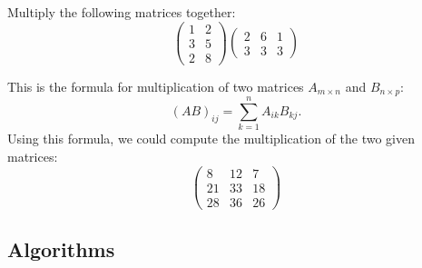 \documentclass{ximera}
\begin{document}
\begin{question}
Multiply the following matrices together:
\[ \left( \begin{array}{cc}
1 & 2 \\
3 & 5 \\
2 & 8
\end{array} \right)
%
\left( \begin{array}{ccc}
2 & 6 & 1 \\
3 & 3 & 3
\end{array} \right)
\]
\begin{solution}
\end{solution}
This is the formula for multiplication of two matrices $A_{m \times n}$ and $B_{n \times p}$:
\[
    (AB)_{ij} = \sum_{k=1}^n A_{ik}B_{kj}. 
\]
Using this formula, we could compute the multiplication of the two given matrices:
\[
\begin{pmatrix}
8 & 12 & 7 \\
21 & 33 & 18 \\
28 & 36 & 26
\end{pmatrix}
\]
\end{question}

\subsection*{Algorithms}
\end{document}
